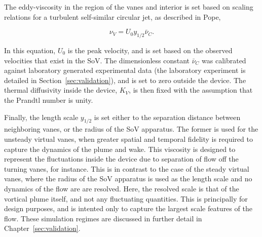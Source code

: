 The eddy-viscosity in the region of the vanes and interior is set
based on scaling relations for a turbulent self-similar circular jet, as
described in Pope\cite{pope2000turbulent},
 
\begin{equation}
  \nu_V = U_0 y_{1/2} \bar \nu_C.
\end{equation}

In this equation, $U_0$ is the peak velocity, 
and is set based on the observed
velocities that exist in the SoV. 
%
The dimensionless constant $\bar \nu_C $ was calibrated against
laboratory generated experimental data 
(the laboratory experiment is detailed in Section~\ref{sec:validation}), 
and is set to zero outside the device. 
The thermal diffusivity inside the device, $K_V$, is then fixed with the 
assumption that the Prandtl number is unity.  

Finally, the length scale $y_{1/2}$ is set either to the 
separation distance between neighboring vanes, or the radius of the SoV
apparatus. The former is used for the unsteady virtual vanes, when
greater spatial and temporal fidelity is required to capture the
dynamics of the plume and wake. This viscosity is designed to represent
the fluctuations inside the device due to separation of flow off the
turning vanes, for instance. This is in contrast to the case of the
steady virtual vanes, where the radius of the SoV apparatus is used as
the length scale and no dynamics of the flow are are resolved. Here, the
resolved scale is that of the vortical plume itself, and not any
fluctuating quantities. This is principally for design purposes, and is
intented only to capture the largest scale features of the flow. These
simulation regimes are discussed in further detail in
Chapter~\ref{sec:validation}. 



